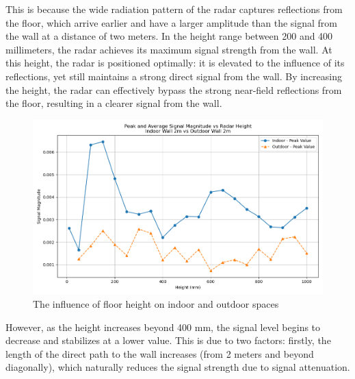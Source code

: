This is because the wide radiation pattern of the radar captures reflections from the floor, which arrive earlier and have a larger amplitude than the signal from the wall at a distance of two meters.
In the height range between 200 and 400 millimeters, the radar achieves its maximum signal strength from the wall. At this height, the radar is positioned optimally: it is elevated to the influence of its reflections, yet still maintains a strong direct signal from the wall. By increasing the height, the radar can effectively bypass the strong near-field reflections from the floor, resulting in a clearer signal from the wall.

\begin{figure}[H]
        \centering
        \includegraphics[width=0.75\linewidth]{Src//images/radar flor .png}
        \caption{The influence of floor height on indoor and outdoor spaces}
        \label{fig:radar-flor}
    \end{figure}


However, as the height increases beyond 400 mm, the signal level begins to decrease and stabilizes at a lower value. This is due to two factors: firstly, the length of the direct path to the wall increases (from 2 meters and beyond diagonally), which naturally reduces the signal strength due to signal attenuation. 

